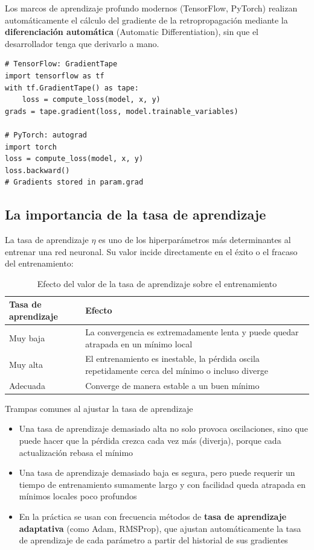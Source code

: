 Los marcos de aprendizaje profundo modernos (TensorFlow, PyTorch) realizan automáticamente el cálculo del gradiente de la retropropagación mediante la \textbf{diferenciación automática} (Automatic Differentiation), sin que el desarrollador tenga que derivarlo a mano.

\begin{lstlisting}[caption={Diferenciación automática en TensorFlow y PyTorch}]
# TensorFlow: GradientTape
import tensorflow as tf
with tf.GradientTape() as tape:
    loss = compute_loss(model, x, y)
grads = tape.gradient(loss, model.trainable_variables)

# PyTorch: autograd
import torch
loss = compute_loss(model, x, y)
loss.backward()
# Gradients stored in param.grad
\end{lstlisting}

\subsection{La importancia de la tasa de aprendizaje}

La tasa de aprendizaje $\eta$ es uno de los hiperparámetros más determinantes al entrenar una red neuronal. Su valor incide directamente en el éxito o el fracaso del entrenamiento:

\begin{table}[H]
\centering
\begin{tabular}{lp{9cm}}
\toprule
\textbf{Tasa de aprendizaje} & \textbf{Efecto} \\
\midrule
Muy baja & La convergencia es extremadamente lenta y puede quedar atrapada en un mínimo local \\
Muy alta & El entrenamiento es inestable, la pérdida oscila repetidamente cerca del mínimo o incluso diverge \\
Adecuada & Converge de manera estable a un buen mínimo \\
\bottomrule
\end{tabular}
\caption{Efecto del valor de la tasa de aprendizaje sobre el entrenamiento}
\end{table}

\begin{warningbox}{Trampas comunes al ajustar la tasa de aprendizaje}
\begin{itemize}
\item Una tasa de aprendizaje demasiado alta no solo provoca oscilaciones, sino que puede hacer que la pérdida crezca cada vez más (diverja), porque cada actualización rebasa el mínimo
\item Una tasa de aprendizaje demasiado baja es segura, pero puede requerir un tiempo de entrenamiento sumamente largo y con facilidad queda atrapada en mínimos locales poco profundos
\item En la práctica se usan con frecuencia métodos de \textbf{tasa de aprendizaje adaptativa} (como Adam, RMSProp), que ajustan automáticamente la tasa de aprendizaje de cada parámetro a partir del historial de sus gradientes
\end{itemize}
\end{warningbox}


